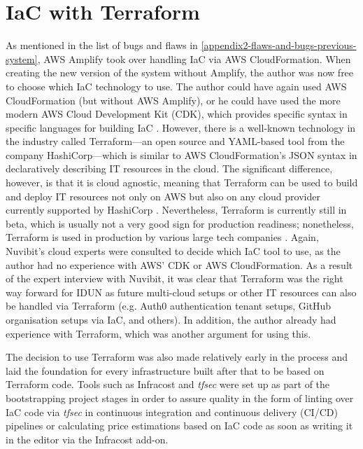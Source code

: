 \section*{IaC with Terraform}
\label{chapter4-iac-with-terraform}

As mentioned in the list of bugs and flaws in \autoref{appendix2-flaws-and-bugs-previous-system}, AWS Amplify took over handling IaC via AWS CloudFormation. When creating the new version of the system without Amplify, the author was now free to choose which IaC technology to use. The author could have again used AWS CloudFormation (but without AWS Amplify), or he could have used the more modern AWS Cloud Development Kit (CDK), which provides specific syntax in specific languages for building IaC \citep{amazon_web_services_inc_aws_nodate}. However, there is a well-known technology in the industry called Terraform—an open source and YAML-based tool from the company HashiCorp—which is similar to AWS CloudFormation’s JSON syntax in declaratively describing IT resources in the cloud. The significant difference, however, is that it is cloud agnostic, meaning that Terraform can be used to build and deploy IT resources not only on AWS but also on any cloud provider currently supported by HashiCorp \citep{hashicorp_browse_nodate}. Nevertheless, Terraform is currently still in beta, which is usually not a very good sign for production readiness; nonetheless, Terraform is used in production by various large tech companies \citep{stackshare_why_nodate}. Again, Nuvibit’s cloud experts were consulted to decide which IaC tool to use, as the author had no experience with AWS’ CDK or AWS CloudFormation. As a result of the expert interview with Nuvibit, it was clear that Terraform was the right way forward for IDUN as future multi-cloud setups or other IT resources can also be handled via Terraform (e.g. Auth0 authentication tenant setups, GitHub organisation setups via IaC, and others). In addition, the author already had experience with Terraform, which was another argument for using this.


The decision to use Terraform was also made relatively early in the process and laid the foundation for every infrastructure built after that to be based on Terraform code. Tools such as Infracost and \textit{tfsec} were set up as part of the bootstrapping project stages in order to assure quality in the form of linting over IaC code via \textit{tfsec} in continuous integration and continuous delivery (CI/CD) pipelines or calculating price estimations based on IaC code as soon as writing it in the editor via the Infracost add-on.

